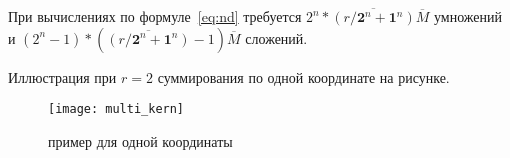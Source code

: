 При вычислениях по формуле~\eqref{eq:nd} требуется
$2^n * \overline{(r/\mathbf{2}^n+\mathbf{1}^n)} \overline{M}$
умножений и
$(2^n-1) * (\overline{(r/\mathbf{2}^n+\mathbf{1}^n)} -1)  \overline{M}$
сложений. 




\begin{comment}
\emph{Двумерный случай:}

\begin{equation*}
  \begin{split}
    G_r[m_1,m_2] &= 
    \sum_{i_1 = 0}^{r_1/2 +1} \sum_{i_2 = 0}^{r_2/2 +1}
        F \left[ \left \lfloor {m_1}/{N_1} \right \rfloor - i_1, \left \lfloor {m_2}/{N_2} \right \rfloor - i_2\right]
      \Psi_{r_1+2,r_2+2}[i_1N_1 + m_1\bmod N_1,i_2N_2 + m_2\bmod N_2] 
       + \\
    &  +
      F \left[\left\lfloor {m_1}/{N_1} \right \rfloor + (i_1+1), \left\lfloor {m_2}/{N_2} \right \rfloor + (i_2+1)  \right]
      \Psi_{r_1+2,r_2+2}[(i_1+1)N_1 - m_1 \bmod N_1,(i_2+1)N_2 - m_2 \bmod N_2]
  \end{split}
\end{equation*}
  
\end{comment}


Иллюстрация при $r=2$ суммирования по одной координате на рисунке.
\begin{figure}[h!]
  \centering
  \texttt{[image: multi\_kern]} 
  \caption{пример для одной координаты}
  \label{fig:reg_net}
\end{figure}
\FloatBarrier



